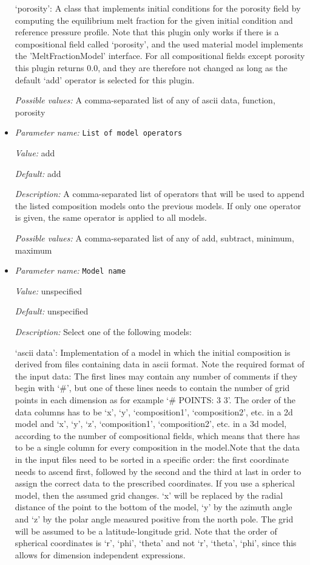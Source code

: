 \begin{itemize}
`porosity': A class that implements initial conditions for the porosity field by computing the equilibrium melt fraction for the given initial condition and reference pressure profile. Note that this plugin only works if there is a compositional field called `porosity', and the used material model implements the 'MeltFractionModel' interface. For all compositional fields except porosity this plugin returns 0.0, and they are therefore not changed as long as the default `add' operator is selected for this plugin.


{\it Possible values:} A comma-separated list of any of ascii data, function, porosity
\item {\it Parameter name:} {\tt List of model operators}
\label{parameters:Initial composition model/List of model operators}


{\it Value:} add


{\it Default:} add


{\it Description:} A comma-separated list of operators that will be used to append the listed composition models onto the previous models. If only one operator is given, the same operator is applied to all models.


{\it Possible values:} A comma-separated list of any of add, subtract, minimum, maximum
\item {\it Parameter name:} {\tt Model name}
\label{parameters:Initial composition model/Model name}


{\it Value:} unspecified


{\it Default:} unspecified


{\it Description:} Select one of the following models:

`ascii data': Implementation of a model in which the initial composition is derived from files containing data in ascii format. Note the required format of the input data: The first lines may contain any number of comments if they begin with `\#', but one of these lines needs to contain the number of grid points in each dimension as for example `\# POINTS: 3 3'. The order of the data columns has to be `x', `y', `composition1', `composition2', etc. in a 2d model and `x', `y', `z', `composition1', `composition2', etc. in a 3d model, according to the number of compositional fields, which means that there has to be a single column for every composition in the model.Note that the data in the input files need to be sorted in a specific order: the first coordinate needs to ascend first, followed by the second and the third at last in order to assign the correct data to the prescribed coordinates. If you use a spherical model, then the assumed grid changes. `x' will be replaced by the radial distance of the point to the bottom of the model, `y' by the azimuth angle and `z' by the polar angle measured positive from the north pole. The grid will be assumed to be a latitude-longitude grid. Note that the order of spherical coordinates is `r', `phi', `theta' and not `r', `theta', `phi', since this allows for dimension independent expressions.


\end{itemize}
